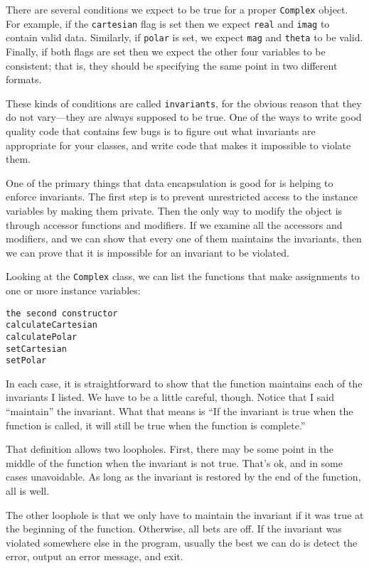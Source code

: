 There are several conditions we expect to be true for a proper
{\tt Complex} object.  For example, if the {\tt cartesian} flag
is set then we expect {\tt real} and {\tt imag} to contain valid
data.  Similarly, if {\tt polar} is set, we expect {\tt mag}
and {\tt theta} to be valid.  Finally, if both flags are set
then we expect the other four variables to be consistent;
that is, they should be specifying the same point in two different
formats.

These kinds of conditions are called {\tt invariants}, for the obvious
reason that they do not vary---they are always supposed to be true.
One of the ways to write good quality code that contains few bugs
is to figure out what invariants are appropriate for your classes,
and write code that makes it impossible to violate them.


One of the primary things that data encapsulation is good for
is helping to enforce invariants.  The first step is to prevent
unrestricted access to the instance variables by making them
private.  Then the only way to modify the object is through
accessor functions and modifiers.  If we examine all the accessors
and modifiers, and we can show that every one of them maintains
the invariants, then we can prove that it is impossible for
an invariant to be violated.

Looking at the {\tt Complex} class, we can list the functions
that make assignments to one or more instance variables:

\begin{verbatim}
the second constructor
calculateCartesian
calculatePolar
setCartesian
setPolar
\end{verbatim}
%
In each case, it is straightforward to show that the function
maintains each of the invariants I listed.  We have to be a little
careful, though.  Notice that I said ``maintain'' the invariant.
What that means is ``If the invariant is true when the function
is called, it will still be true when the function is complete.''

That definition allows two loopholes.  First, there may be some
point in the middle of the function when the invariant is not
true.  That's ok, and in some cases unavoidable.  As long as the
invariant is restored by the end of the function, all is well.

The other loophole is that we only have to maintain the invariant
if it was true at the beginning of the function.  Otherwise, all
bets are off.  If the invariant was violated somewhere else in
the program, usually the best we can do is detect the error,
output an error message, and exit.

